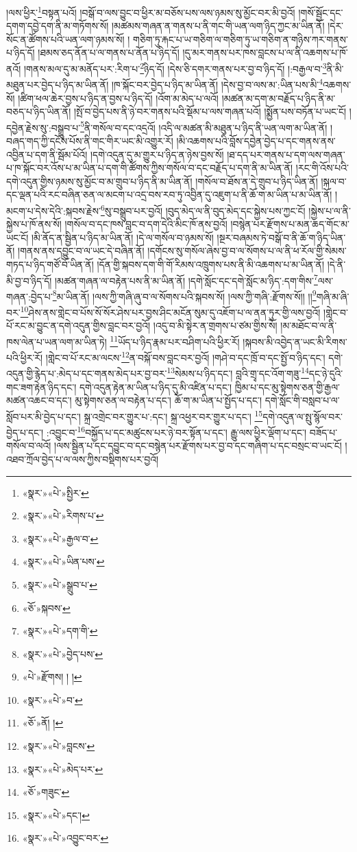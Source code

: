 །ལས་ཕྱིར་\footnote{«སྣར་»«པེ་»སྤྱིར་}བསྟན་པའོ། །བསྒོ་བ་ལས་བྱུང་བ་ཕྱིར་མ་བཅོས་པས་ལས་ཉམས་སུ་མྱོང་བར་མི་བྱའོ། །གསོ་སྦྱོང་དང་དགག་དབྱེ་དག་ནི་མ་གཏོགས་སོ། །མཚམས་གཞན་ན་གནས་པ་ནི་གང་གི་ཡན་ལག་ཉིད་ཀྱང་མ་ཡིན་ནོ། །དེར་སོང་ན་ཚོགས་པའི་ཡན་ལག་ཉམས་སོ། །
གཅིག་ཏུ་རྐང་པ་ཡ་གཅིག་ལ་གཅིག་ཏུ་ཡ་གཅིག་ན་གཉིས་ཀར་གནས་པ་ཉིད་དོ། །ཐམས་ཅད་ནོན་པ་ལ་གནས་པ་ནོན་པ་ཉིད་དོ། །དུ་མར་གནས་པར་ཁས་བླངས་པ་ལ་ནི་འཆགས་པ་ཁོ་ནའོ། །གནས་མལ་དུ་མ་མནོད་པར་:རིག་པ་\footnote{«སྣར་»«པེ་»རིགས་པ་}ཉིད་དོ། །དེས་ཅི་དགར་གནས་པར་བྱ་བ་ཉིད་དོ། །:བརྒྱལ་བ་\footnote{«སྣར་»«པེ་»རྒྱལ་བ་}ནི་མི་མཐུན་པར་བྱེད་པ་ཉིད་མ་ཡིན་ནོ། །ཁ་སྐོང་བར་བྱེད་པ་ཉིད་མ་ཡིན་ནོ། །དེས་བྱ་བ་ལས་མ་:ཡིན་པས་མི་\footnote{«སྣར་»«པེ་»ཡིན་པས་}འཆགས་སོ། །ཚིག་ཕལ་ཆེར་བྱས་པ་ཉིད་ན་བྱས་པ་ཉིད་དོ། །འོག་མ་མེད་པ་ལའོ། །མཚན་མ་དག་མ་བརྗོད་པ་ཉིད་ནི་མ་བཅད་པ་ཉིད་ཡིན་ནོ། །སྤོ་བ་བྱེད་པས་ནི་ཉེ་བར་གནས་པའི་སྡོམ་པ་ལས་གཞན་པའོ། །སྨྱོན་པས་བཏོན་པ་ཡང་ངོ། །དབྱེན་རྗེས་སུ་:བསྒྲུབ་པ་\footnote{«སྣར་»«པེ་»སྒྲུབ་པ་}ནི་གསོལ་བ་དང་འདྲའོ། །འདི་ལ་མཚན་མི་མཐུན་པ་ཉིད་ནི་ཡན་ལག་མ་ཡིན་ནོ། །བཞད་གད་ཀྱི་དངོས་པོས་ནི་གང་གིར་ཡང་མི་འགྱུར་རོ། །མི་འཆགས་པའི་བློས་དབྱེན་བྱེད་པ་དང་གནས་ནས་འབྱིན་པ་དག་ནི་སྦོམ་པོའོ། །དགེ་འདུན་དུ་མ་གྱུར་པ་ཉིད་ན་ཉེས་བྱས་སོ། །ཐ་དད་པར་གནས་པ་དག་ལས་གཞན་པ་ཁ་སྐོང་བར་འོས་པ་མ་ཡིན་པ་དག་གི་ཚོགས་ཀྱིས་གསོལ་བ་དང་བརྗོད་པ་དག་ནི་མ་ཡིན་ནོ། །རང་གི་འོས་པའི་དགེ་འདུན་གྱིས་ཉམས་སུ་མྱོང་བ་མ་གྲུབ་པ་ཉིད་ནི་མ་ཡིན་ནོ། །གསོལ་བ་ཐོས་ན་དེ་གྲུབ་པ་ཉིད་ཡིན་ནོ། །སྐལ་བ་དང་ལྡན་པའི་རང་བཞིན་ཅན་ལ་མངག་པ་འདྲ་བས་རབ་ཏུ་འབྱིན་དུ་འཇུག་པ་ནི་ཆོ་ག་མ་ཡིན་པ་མ་ཡིན་ནོ། །མངག་པ་དེས་དེའི་:སྐབས་རྗེས་\footnote{«ཅོ་»སྐབས་}སུ་བསྒྲུབ་པར་བྱའོ། །བུད་མེད་ལ་ནི་བུད་མེད་དང་སྐྱེས་པས་ཀྱང་ངོ། །སྐྱེས་པ་ལ་ནི་སྐྱེས་པ་ཁོ་ནས་སོ། །གསོལ་བ་དང་ཁས་བླང་བ་དག་དེའི་མིང་ཁོ་ནས་བྱའོ། །བསྙེན་པར་རྫོགས་པ་མན་ཆད་གོང་མ་ཡང་ངོ། །མི་ནོད་ན་སྦྱིན་པ་ཉིད་མ་ཡིན་ནོ། །དེ་ལ་གསོལ་བ་ཉམས་སོ། །སྔར་བཞམས་ཏེ་བསྒོ་བ་ནི་ཆོ་ག་ཉིད་ཡིན་ནོ། །གནས་ནས་དབྱུང་བ་ལ་ཡང་དེ་བཞིན་ནོ། །དགོངས་སུ་གསོལ་ཞེས་བྱ་བ་ལ་སོགས་པ་ལ་ནི་ཕ་རོལ་གྱི་སེམས་གཏད་པ་ཉིད་གཙོ་བོ་ཡིན་ནོ། །དོན་གྱི་སྐབས་དག་གི་གོ་རིམས་འཁྲུགས་པས་ནི་མི་འཆགས་པ་མ་ཡིན་ནོ། །དེ་ནི་མི་བྱ་བ་ཉིད་དོ། །མཚན་གཞན་ལ་བརྟེན་པས་ནི་མ་ཡིན་ནོ། །དགེ་སློང་དང་དགེ་སློང་མ་ཉིད་:དག་གིས་\footnote{«སྣར་»«པེ་»དག་གི་}ལས་གཞན་:བྱེད་པ་\footnote{«སྣར་»«པེ་»བྱེད་པས་}མ་ཡིན་ནོ། །ལས་ཀྱི་གཞི་ཞུ་བ་ལ་སོགས་པའི་སྐབས་སོ། །ལས་ཀྱི་གཞི་:རྫོགས་སོ།། །།\footnote{«པེ་»རྫོགས། ། །}གཞི་མ་ཞི་བར་\footnote{«སྣར་»«པེ་»བ་}ཤེས་ནས་གླེང་བ་པོས་སོ་སོར་ཤེས་པར་བྱས་ཤིང་མངོན་སུམ་དུ་འཇོག་པ་ལ་ནན་ཏུར་གྱི་ལས་བྱའོ། །གླེང་བ་པོ་རང་མ་བྱུང་ན་དགེ་འདུན་གྱིས་བླང་བར་བྱའོ། །འདུ་བ་མི་སྟེར་ན་གྲགས་པ་ཙམ་གྱིས་སོ། །མ་མཐོང་བ་ལ་ནི་ཁས་ལེན་པ་ཡན་ལག་མ་ཡིན་ཏེ། \footnote{«ཅོ་»ནོ། ། }ཡོད་པ་ཉིད་རྣམ་པར་བཤིག་པའི་ཕྱིར་རོ། །སྐབས་མི་འབྱེད་ན་ཡང་མི་རིགས་པའི་ཕྱིར་རོ། །གླེང་བ་པོ་རང་མ་ལངས་\footnote{«སྣར་»«པེ་»བླངས་}ན་བསྐོ་བས་བླང་བར་བྱའོ། །གཤེ་བ་དང་ཁྲོ་བ་དང་སྤྱོ་བ་ཉིད་དང་། དགེ་འདུན་གྱི་རྙེད་པ་:མེད་པ་དང་གནས་མེད་པར་བྱ་བར་\footnote{«སྣར་»«པེ་»མེད་པར་}སེམས་པ་ཉིད་དང་། བླའི་གྲྭ་དང་འོག་གཟུ་\footnote{«ཅོ་»གཟུང་}དང་ཉེ་དུའི་གང་ཟག་རྟེན་ཉིད་དང་། དགེ་འདུན་རྟེན་མ་ཡིན་པ་ཉིད་དུ་མི་འཛིན་པ་དང་། ཁྱིམ་པ་དང་མུ་སྟེགས་ཅན་གྱི་རྒྱལ་མཚན་འཆང་བ་དང་། མུ་སྟེགས་ཅན་ལ་བརྟེན་པ་དང་། ཆོ་ག་མ་ཡིན་པ་སྤྱོད་པ་དང་། དགེ་སློང་གི་བསླབ་པ་ལ་སློབ་པར་མི་བྱེད་པ་དང་། སྐྲ་འགྲེང་བར་གྱུར་པ་:དང་། སྐྲ་འཕྱར་བར་གྱུར་པ་དང་། \footnote{«སྣར་»«པེ་»དང་།  }དགེ་འདུན་ལ་སྤུ་སྙོལ་བར་བྱེད་པ་དང་། :འབྱུང་བ་\footnote{«སྣར་»«པེ་»འབྱུང་བར་}བསྐྱོད་པ་དང་མཚུངས་པར་ཉེ་བར་སྟོན་པ་དང་། རྒྱུ་ལས་ཕྱིར་ལྡོག་པ་དང་། བཟོད་པ་གསོལ་བ་ལའོ། །ལས་སྦྱིན་པ་དང་དབྱུང་བ་དང་བསྙེན་པར་རྫོགས་པར་བྱ་བ་དང་གཞིག་པ་དང་བསྲང་བ་ཡང་ངོ། །འཐབ་ཀྲོལ་བྱེད་པ་ལ་ལས་ཀྱིས་བསྡིགས་པར་བྱའོ། 